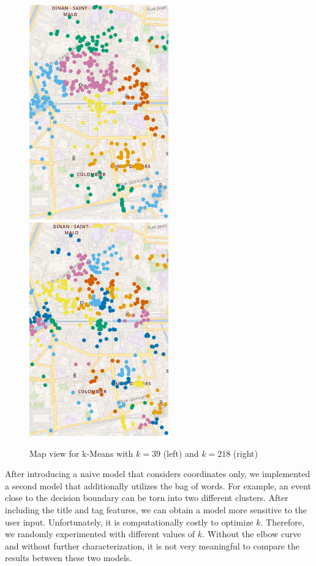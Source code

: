 \documentclass[runningheads]{llncs}
\begin{document}
\begin{figure}
\centering
\includegraphics[width=6cm]{k=39.png}
\includegraphics[width=6cm]{k=218.png}
\caption{Map view for k-Means with $k=39$ (left) and $k=218$ (right)} \label{mapViewsFor2k}
\end{figure}

After introducing a naive model that considers coordinates only, we implemented a second model that additionally utilizes the bag of words. For example, an event close to the decision boundary can be torn into two different clusters. After including the title and tag features, we can obtain a model more sensitive to the user input. Unfortunately, it is computationally costly to optimize $k$. Therefore, we randomly experimented with different values of $k$. Without the elbow curve and without further characterization, it is not very meaningful to compare the results between these two models.
\end{document}
